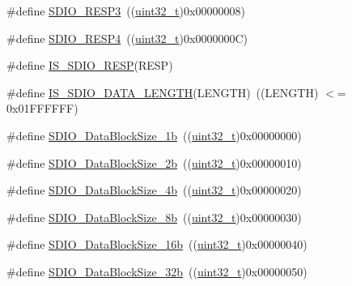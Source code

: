 \begin{DoxyCompactItemize}
\#define \hyperlink{group___s_d_i_o___response___registers_gae9887669a72395d54d600829a959d2f4}{S\+D\+I\+O\+\_\+\+R\+E\+S\+P3}~((\hyperlink{_p_e___types_8h_a33594304e786b158f3fb30289278f5af}{uint32\+\_\+t})0x00000008)
\item 
\#define \hyperlink{group___s_d_i_o___response___registers_ga57c3f6414198e5497736e398c02a1d9e}{S\+D\+I\+O\+\_\+\+R\+E\+S\+P4}~((\hyperlink{_p_e___types_8h_a33594304e786b158f3fb30289278f5af}{uint32\+\_\+t})0x0000000\+C)
\item 
\#define \hyperlink{group___s_d_i_o___response___registers_gaea6a7f75a5e677d50ba5c9ae2d3a7839}{I\+S\+\_\+\+S\+D\+I\+O\+\_\+\+R\+E\+SP}(R\+E\+SP)
\item 
\#define \hyperlink{group___s_d_i_o___data___length_ga57dd64db3f69d18625ea8ca82c009fad}{I\+S\+\_\+\+S\+D\+I\+O\+\_\+\+D\+A\+T\+A\+\_\+\+L\+E\+N\+G\+TH}(L\+E\+N\+G\+TH)~((L\+E\+N\+G\+TH) $<$= 0x01\+F\+F\+F\+F\+F\+F)
\item 
\#define \hyperlink{group___s_d_i_o___data___block___size_gaa86e90ddc3426b242a5230b3360c620d}{S\+D\+I\+O\+\_\+\+Data\+Block\+Size\+\_\+1b}~((\hyperlink{_p_e___types_8h_a33594304e786b158f3fb30289278f5af}{uint32\+\_\+t})0x00000000)
\item 
\#define \hyperlink{group___s_d_i_o___data___block___size_ga7209d9d52635b66df85712c6fcd668ea}{S\+D\+I\+O\+\_\+\+Data\+Block\+Size\+\_\+2b}~((\hyperlink{_p_e___types_8h_a33594304e786b158f3fb30289278f5af}{uint32\+\_\+t})0x00000010)
\item 
\#define \hyperlink{group___s_d_i_o___data___block___size_ga59cbaecfdebd63177d1208c268626f0a}{S\+D\+I\+O\+\_\+\+Data\+Block\+Size\+\_\+4b}~((\hyperlink{_p_e___types_8h_a33594304e786b158f3fb30289278f5af}{uint32\+\_\+t})0x00000020)
\item 
\#define \hyperlink{group___s_d_i_o___data___block___size_ga14f91159c8c4faf49a335ed9b6a94d0b}{S\+D\+I\+O\+\_\+\+Data\+Block\+Size\+\_\+8b}~((\hyperlink{_p_e___types_8h_a33594304e786b158f3fb30289278f5af}{uint32\+\_\+t})0x00000030)
\item 
\#define \hyperlink{group___s_d_i_o___data___block___size_ga52a7bdab9a75edd94d9c1152e8b078e2}{S\+D\+I\+O\+\_\+\+Data\+Block\+Size\+\_\+16b}~((\hyperlink{_p_e___types_8h_a33594304e786b158f3fb30289278f5af}{uint32\+\_\+t})0x00000040)
\item 
\#define \hyperlink{group___s_d_i_o___data___block___size_gad0f89aa989c0cedf8d69eb28548413ca}{S\+D\+I\+O\+\_\+\+Data\+Block\+Size\+\_\+32b}~((\hyperlink{_p_e___types_8h_a33594304e786b158f3fb30289278f5af}{uint32\+\_\+t})0x00000050)

\end{DoxyCompactItemize}
